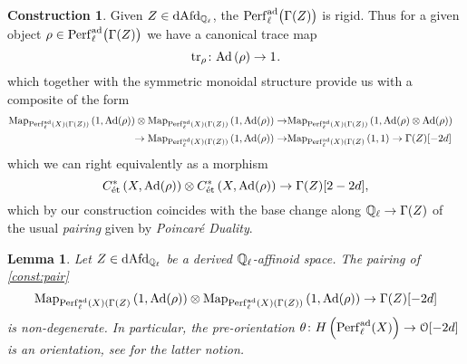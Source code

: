 \documentclass[10pt,a4paper]{amsart}
\numberwithin{equation}{subsection}
\theoremstyle{plain}
\newtheorem{lemma}[theorem]{Lemma}
\theoremstyle{definition}
\newtheorem{construction}[theorem]{Construction}
\theoremstyle{remark}
\numberwithin{equation}{section}
\begin{document}
\begin{construction}
Given $Z \in \mathrm{dAfd}_{\mathbb{Q}_\ell}$, the \infcat $\mathrm{Perf}^{\mathrm{ad}}_\ell \big( \Gamma(Z) \big)$ is rigid. Thus for a given object $\rho \in \mathrm{Perf}^{\mathrm{ad}}_\ell \big( \Gamma(Z) \big)$ we have a canonical trace map
	\[
		\mathrm{tr}_{\rho} \colon \mathrm{Ad} \left( \rho \right) \to 1_{		} .
	\]
which together with the symmetric monoidal structure provide us with a composite of the form
	\begin{align}
		 \mathrm{Map}_{\mathrm{Perf}^{\mathrm{ad}}_\ell(X)(\Gamma(Z))} \left( 1 , \mathrm{Ad}(\rho) \right) \otimes \mathrm{Map}_{\mathrm{Perf}^{\mathrm{ad}}_\ell(X)(\Gamma(Z))} \left(  1, \mathrm{Ad}( \rho) \right) \to & \mathrm{Map}_{\mathrm{Perf}^{\mathrm{ad}}_\ell(X)(\Gamma(Z))} \left( 1 , \mathrm{Ad}(\rho)  \otimes \mathrm{Ad} (\rho) 	
		 \right)  \\ 
		\to \mathrm{Map}_{\mathrm{Perf}^{\mathrm{ad}}_\ell(X)(\Gamma(Z))} \left( 1, \mathrm{Ad}(\rho) \right)	 \to & \mathrm{Map}_{\mathrm{Perf}^{\mathrm{ad}}_\ell(X)(\Gamma(Z)} \left( 1, 1 \right) \to  \Gamma(Z)[-2d] &	
	\end{align}
which we can right equivalently as a morphism
	\[
		C^*_{\text{\'et}} \left( X, \mathrm{Ad}(\rho) \right) \otimes C^*_{\text{\'et}} \left( X, \mathrm{Ad}(\rho) \right) \to \Gamma(Z)[2-2d],
	\]
which by our construction coincides with the base change along $\mathbb{Q}_\ell \to \Gamma(Z)$ of the usual \emph{pairing} given by \emph{Poincar\'e Duality}.
\end{construction}

\begin{lemma}
Let $Z \in \mathrm{dAfd}_{\mathbb{Q}_\ell}$ be a derived $\mathbb Q_\ell$-affinoid space. The pairing of \cref{const:pair}
	\[
		\mathrm{Map}_{\mathrm{Perf}^{\mathrm{ad}}_\ell(X)(\Gamma(Z)} \left( 1, \mathrm{Ad} (\rho) \right) \otimes \mathrm{Map}_{\mathrm{Perf}^{\mathrm{ad}}_\ell(X)(\Gamma(Z))} \left( 1, \mathrm{Ad}(\rho) \right) \to \Gamma(Z) [-2d]
	\]
is non-degenerate. In particular, the pre-orientation $\theta \colon H \left( \mathrm{Perf}^{\mathrm{ad}}_\ell(X) \right) \to \mathcal{O}[-2d]$ is an orientation, see \cite[Definition 3.4]{toen_ss} for the latter notion.
\end{lemma}
\end{document}
